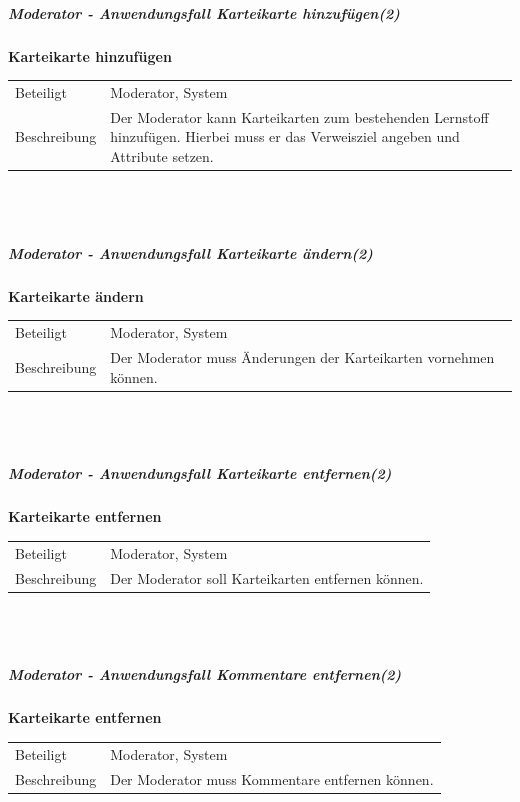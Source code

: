 \documentclass[12pt,a4paper]{article}
\begin{document}
{\subparagraph{Moderator - Anwendungsfall \glqq Karteikarte hinzufügen\grqq (2)}\mbox{}

\textbf{Karteikarte hinzufügen}\\
\begin{tabular}{l|p{12cm}}
\hline 
Beteiligt & Moderator, System \\ 
Beschreibung & Der Moderator kann Karteikarten zum bestehenden Lernstoff hinzufügen. Hierbei muss er das Verweisziel angeben und Attribute setzen. \\ 
\end{tabular}\\\\

\subparagraph{Moderator - Anwendungsfall \glqq Karteikarte ändern\grqq (2)}\mbox{}

\textbf{Karteikarte ändern}\\
\begin{tabular}{l|p{12cm}}
\hline 
Beteiligt & Moderator, System \\ 
Beschreibung & Der Moderator muss Änderungen der Karteikarten vornehmen können. \\ 
\end{tabular}\\\\

\newpage

\subparagraph{Moderator - Anwendungsfall \glqq Karteikarte entfernen\grqq (2)}\mbox{}

\textbf{Karteikarte entfernen}\\
\begin{tabular}{l|p{12cm}}
\hline 
Beteiligt & Moderator, System \\ 
Beschreibung & Der Moderator soll Karteikarten entfernen können. \\ 
\end{tabular}\\\\


\subparagraph{Moderator - Anwendungsfall \glqq Kommentare entfernen\grqq (2)}\mbox{}

\textbf{Karteikarte entfernen}\\
\begin{tabular}{l|p{12cm}}
\hline 
Beteiligt & Moderator, System \\ 
Beschreibung & Der Moderator muss Kommentare entfernen können. \\ 
\end{tabular}\\\\

}
\end{document}
